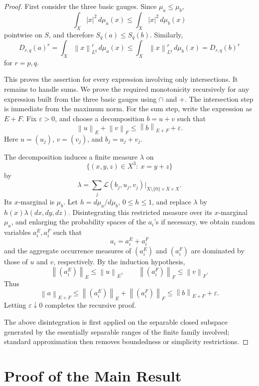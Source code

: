 \documentclass[11pt]{article}
\newcommand{\norm}[1]{\left\lVert #1\right\rVert}
\begin{document}
\begin{proof}
First consider the three basic gauges.  Since \(\mu_a\leq\mu_b\),
\[
  \int_X |x|^2\,d\mu_a(x)
  \leq
  \int_X |x|^2\,d\mu_b(x)
\]
pointwise on \(S\), and therefore \(S_q(a)\leq S_q(b)\).  Similarly,
\[
  D_{r,q}(a)^r
  =
  \int_X\norm{x}_{L^q}^r\,d\mu_a(x)
  \leq
  \int_X\norm{x}_{L^q}^r\,d\mu_b(x)
  =
  D_{r,q}(b)^r
\]
for \(r=p,q\).

This proves the assertion for every expression involving only intersections.
It remains to handle sums.  We prove the required monotonicity recursively for
any expression built from the three basic gauges using \(\cap\) and \(+\).
The intersection step is immediate from the maximum norm.  For the sum step,
write the expression as \(E+F\).  Fix \(\varepsilon>0\), and choose a
decomposition \(b=u+v\) such that
\[
   \norm{u}_{E}+\norm{v}_{F}
   \leq
   \norm{b}_{E+F}+\varepsilon .
\]
Here \(u=(u_j)\), \(v=(v_j)\), and \(b_j=u_j+v_j\).

The decomposition induces a finite measure \(\lambda\) on
\[
   \{(x,y,z)\in X^3:\ x=y+z\}
\]
by
\[
   \lambda=\sum_j\mathcal L(b_j,u_j,v_j)|_{X\setminus\{0\}\times X\times X}.
\]
Its \(x\)-marginal is \(\mu_b\).  Let \(h=d\mu_a/d\mu_b\), \(0\leq h\leq1\),
and replace \(\lambda\) by \(h(x)\lambda(dx,dy,dz)\).  Disintegrating this
restricted measure over its \(x\)-marginal \(\mu_a\), and enlarging the
probability spaces of the \(a_i\)'s if necessary, we obtain random variables
\(a_i^E,a_i^F\) such that
\[
   a_i=a_i^E+a_i^F
\]
and the aggregate occurrence measures of \((a_i^E)\) and \((a_i^F)\) are
dominated by those of \(u\) and \(v\), respectively.  By the induction
hypothesis,
\[
   \norm{(a_i^E)}_E\leq\norm{u}_E,
   \qquad
   \norm{(a_i^F)}_F\leq\norm{v}_F .
\]
Thus
\[
   \norm{a}_{E+F}
   \leq
   \norm{(a_i^E)}_E+\norm{(a_i^F)}_F
   \leq
   \norm{b}_{E+F}+\varepsilon .
\]
Letting \(\varepsilon\downarrow0\) completes the recursive proof.

The above disintegration is first applied on the separable closed subspace
generated by the essentially separable ranges of the finite family involved;
standard approximation then removes boundedness or simplicity restrictions.
\end{proof}

\section*{Proof of the Main Result}
\end{document}
